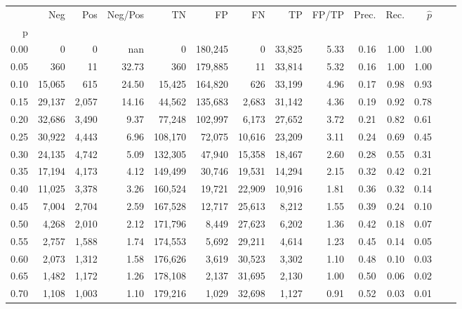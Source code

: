\begin{tabular}{rrrrrrrrrrrrrr}
\toprule
{} &     Neg &    Pos & Neg/Pos &       TN &       FP &      FN &      TP & FP/TP & Prec. &  Rec. & $\hat{p}$ \\
p    &         &        &         &          &          &         &         &       &       &       &           \\
\midrule
0.00 &       0 &      0 &     nan &        0 &  180,245 &       0 &  33,825 &  5.33 &  0.16 &  1.00 &      1.00 \\
0.05 &     360 &     11 &   32.73 &      360 &  179,885 &      11 &  33,814 &  5.32 &  0.16 &  1.00 &      1.00 \\
0.10 &  15,065 &    615 &   24.50 &   15,425 &  164,820 &     626 &  33,199 &  4.96 &  0.17 &  0.98 &      0.93 \\
0.15 &  29,137 &  2,057 &   14.16 &   44,562 &  135,683 &   2,683 &  31,142 &  4.36 &  0.19 &  0.92 &      0.78 \\
0.20 &  32,686 &  3,490 &    9.37 &   77,248 &  102,997 &   6,173 &  27,652 &  3.72 &  0.21 &  0.82 &      0.61 \\
0.25 &  30,922 &  4,443 &    6.96 &  108,170 &   72,075 &  10,616 &  23,209 &  3.11 &  0.24 &  0.69 &      0.45 \\
0.30 &  24,135 &  4,742 &    5.09 &  132,305 &   47,940 &  15,358 &  18,467 &  2.60 &  0.28 &  0.55 &      0.31 \\
0.35 &  17,194 &  4,173 &    4.12 &  149,499 &   30,746 &  19,531 &  14,294 &  2.15 &  0.32 &  0.42 &      0.21 \\
0.40 &  11,025 &  3,378 &    3.26 &  160,524 &   19,721 &  22,909 &  10,916 &  1.81 &  0.36 &  0.32 &      0.14 \\
0.45 &   7,004 &  2,704 &    2.59 &  167,528 &   12,717 &  25,613 &   8,212 &  1.55 &  0.39 &  0.24 &      0.10 \\
0.50 &   4,268 &  2,010 &    2.12 &  171,796 &    8,449 &  27,623 &   6,202 &  1.36 &  0.42 &  0.18 &      0.07 \\
0.55 &   2,757 &  1,588 &    1.74 &  174,553 &    5,692 &  29,211 &   4,614 &  1.23 &  0.45 &  0.14 &      0.05 \\
0.60 &   2,073 &  1,312 &    1.58 &  176,626 &    3,619 &  30,523 &   3,302 &  1.10 &  0.48 &  0.10 &      0.03 \\
0.65 &   1,482 &  1,172 &    1.26 &  178,108 &    2,137 &  31,695 &   2,130 &  1.00 &  0.50 &  0.06 &      0.02 \\
0.70 &   1,108 &  1,003 &    1.10 &  179,216 &    1,029 &  32,698 &   1,127 &  0.91 &  0.52 &  0.03 &      0.01 \\

\end{tabular}
